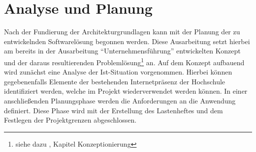 \section{Analyse und Planung}
\label{sec:AnalyseUndPlanung}

Nach der Fundierung der Architekturgrundlagen kann mit der Planung der zu
entwickelnden Softwarelösung begonnen werden. Diese Ausarbeitung setzt hierbei
am bereits in der Ausarbeitung "`Unternehmensführung"' entwickelten Konzept und
der daraus resultierenden Problemlösung\footnote{siehe dazu
\citet{unternehmensfuehrung2014}, Kapitel Konzeptionierung} an. Auf dem Konzept
aufbauend wird zunächst eine Analyse der Ist-Situation vorgenommen. Hierbei
können gegebenenfalls Elemente der bestehenden Internetpräsenz der Hochschule
identifiziert werden, welche im Projekt wiederverwendet werden können. In einer
anschließenden Planungsphase werden die Anforderungen an die Anwendung
definiert. Diese Phase wird mit der Erstellung des Lastenheftes und dem
Festlegen der Projektgrenzen abgeschlossen.





